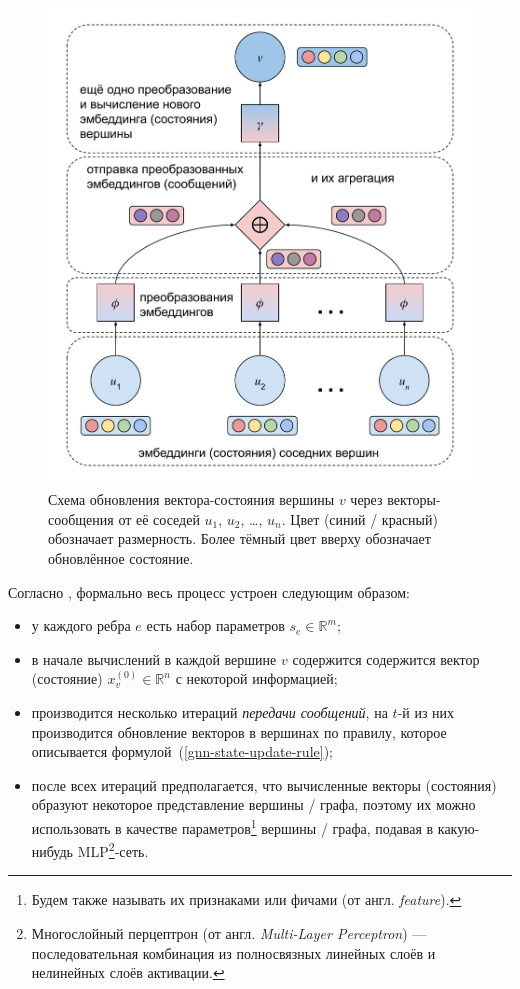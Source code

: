 \begin{figure}[ht]
\begin{center}
    \includegraphics[scale=0.75]{./assets/message-passing-nn-architecture.pdf}
    \caption{\label{message-passing-nn-architecture} Схема обновления вектора-состояния вершины $v$ через векторы-сообщения от её соседей $u_1$, $u_2$, \ldots, $u_n$. Цвет (синий / красный) обозначает размерность. Более тёмный цвет вверху обозначает обновлённое состояние.}
\end{center}
\end{figure}

Согласно \cite{gnn-deep-learning-5g}, формально весь процесс устроен следующим образом:

\begin{itemize}
    \item у каждого ребра $e$ есть набор параметров $s_e \in \mathbb{R}^m$;
    \item в начале вычислений в каждой вершине $v$ содержится содержится вектор (состояние) $x_v^{(0)} \in \mathbb{R}^n$ с некоторой информацией;
    \item производится несколько итераций \textit{передачи сообщений}, на $t$-й из них производится обновление векторов в вершинах по правилу, которое описывается формулой~(\ref{gnn-state-update-rule});
    \item после всех итераций предполагается, что вычисленные векторы (состояния) образуют некоторое представление вершины / графа, поэтому их можно использовать в качестве параметров\footnote{Будем также называть их признаками или фичами (от англ. \textit{feature}).} вершины / графа, подавая в какую-нибудь MLP\footnote{Многослойный перцептрон (от англ. \textit{Multi-Layer Perceptron}) --- последовательная комбинация из полносвязных линейных слоёв и нелинейных слоёв активации.}-сеть.
\end{itemize}

